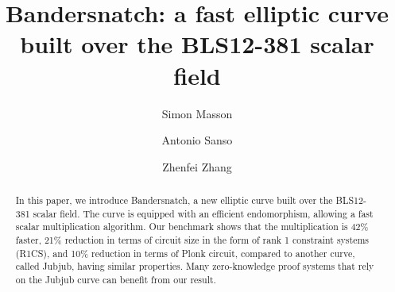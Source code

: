 \documentclass[smallextended]{svjour3}
\begin{document}
\title{Bandersnatch: a fast elliptic curve built over the BLS12-381
  scalar field}
\author{ Simon Masson  \and Antonio Sanso   \and Zhenfei Zhang 
}


\date{}

\makeatletter
\newcommand{\verbatimfont}[1]{\renewcommand{\verbatim@font}{\ttfamily#1}}
\makeatother

\maketitle

\verbatimfont{\small}%

\begin{abstract}
 In this paper, we introduce Bandersnatch, a new elliptic curve
 built over the BLS12-381 scalar field. The curve is equipped with an efficient
 endomorphism, allowing a fast scalar multiplication algorithm.
 Our benchmark shows that the multiplication is 42\% faster, 
 21\% reduction in terms of circuit size in the 
 form of rank 1 constraint systems (R1CS), 
 and 10\% reduction in terms of Plonk circuit,
 compared to another curve, called Jubjub, having similar
 properties. Many zero-knowledge proof systems that rely on
 the Jubjub curve can benefit
 from our result.
\end{abstract}

\\
\end{document}

